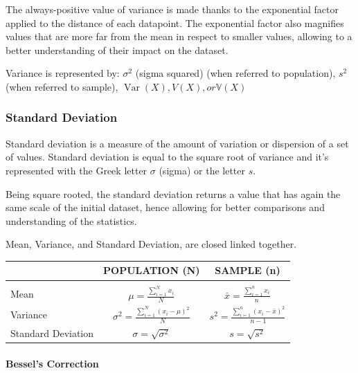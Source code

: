 \documentclass{article}
\begin{document}
The always-positive value of variance is made thanks to the exponential factor applied to the distance of each datapoint. 
The exponential factor also magnifies values that are more far from the mean in respect to smaller values, allowing to a better understanding of their impact on the dataset. 

Variance is represented by: $\sigma ^{2}$ (sigma squared) (when referred to population), ${\displaystyle s^{2}}$ (when referred to sample), ${\displaystyle \operatorname {Var} (X)}, {\displaystyle V(X)}, or {\displaystyle \mathbb {V} (X)}$

\subsubsection{Standard Deviation}
Standard deviation is a measure of the amount of variation or dispersion of a set of values. Standard deviation is equal to the square root of variance and it’s represented with the Greek letter $\sigma$ (sigma) or the letter $s$.

Being square rooted, the standard deviation returns a value that has again the same scale of the initial dataset, hence allowing for better comparisons and understanding of the statistics. 

Mean, Variance, and Standard Deviation, are closed linked together. 

\begin{center}
\begin{tabular}{|m{2cm}|c|c|}
\hline
& POPULATION (N) & SAMPLE (n) \\ \hline
&&\\[-1em]
Mean & $\displaystyle \mu = \frac{\sum\limits _{i=1}^{N} x_{i}}{N}$ & $\displaystyle \bar{x} = \frac{\sum\limits _{i=1}^{n} x_{i}}{n}$ \\[25pt]
Variance & $\displaystyle \sigma^2 = \frac{\sum\limits _{i=1}^{N} (x_{i} - \mu)^2}{N}$ & $\displaystyle s^2 = \frac{\sum\limits _{i=1}^{n} (x_{i} - \bar{x})^2}{n-1}$ \\[25pt]
Standard Deviation & $\displaystyle \sigma = \sqrt{\sigma^2}$ & $\displaystyle s = \sqrt{s^2}$ \\[25pt] 
\hline
\end{tabular}
\end{center}

\paragraph{Bessel's Correction}\mbox{} \\ 
\mbox{} \\
\end{document}
